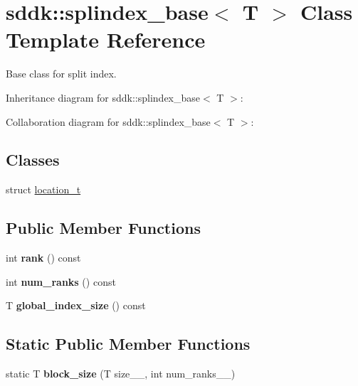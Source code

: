 \hypertarget{classsddk_1_1splindex__base}{}\section{sddk\+:\+:splindex\+\_\+base$<$ T $>$ Class Template Reference}
\label{classsddk_1_1splindex__base}


Base class for split index.  




Inheritance diagram for sddk\+:\+:splindex\+\_\+base$<$ T $>$\+:


Collaboration diagram for sddk\+:\+:splindex\+\_\+base$<$ T $>$\+:
\subsection*{Classes}
\begin{DoxyCompactItemize}
\item 
struct \hyperlink{structsddk_1_1splindex__base_1_1location__t}{location\+\_\+t}
\end{DoxyCompactItemize}
\subsection*{Public Member Functions}
\begin{DoxyCompactItemize}
\item 
\hypertarget{classsddk_1_1splindex__base_ad4cbc2c4cc3e044db8fdfde565c36b8c}{}int {\bfseries rank} () const \label{classsddk_1_1splindex__base_ad4cbc2c4cc3e044db8fdfde565c36b8c}

\item 
\hypertarget{classsddk_1_1splindex__base_ae00076b27a8f84ffa3b091e2ab99a827}{}int {\bfseries num\+\_\+ranks} () const \label{classsddk_1_1splindex__base_ae00076b27a8f84ffa3b091e2ab99a827}

\item 
\hypertarget{classsddk_1_1splindex__base_a9ef40b922da52ebadb0717268e707475}{}T {\bfseries global\+\_\+index\+\_\+size} () const \label{classsddk_1_1splindex__base_a9ef40b922da52ebadb0717268e707475}

\end{DoxyCompactItemize}
\subsection*{Static Public Member Functions}
\begin{DoxyCompactItemize}
\item 
\hypertarget{classsddk_1_1splindex__base_a7a3d2d9afbde2cfc95e0e1bfb20b3134}{}static T {\bfseries block\+\_\+size} (T size\+\_\+\+\_\+, int num\+\_\+ranks\+\_\+\+\_\+)\label{classsddk_1_1splindex__base_a7a3d2d9afbde2cfc95e0e1bfb20b3134}

\end{DoxyCompactItemize}
